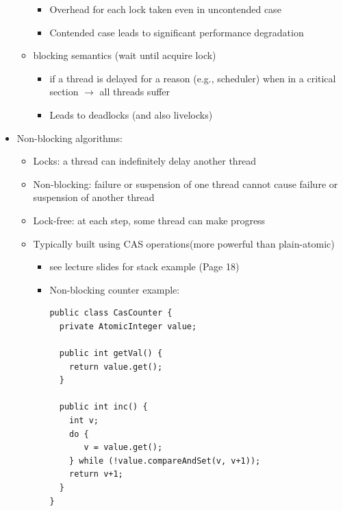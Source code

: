 \documentclass[a4paper]{article}
\begin{document}
\begin{itemize}
\begin{itemize}
\begin{itemize}
\item Overhead for each lock taken even in uncontended case
\item Contended case leads to significant performance degradation
\end{itemize}
\item blocking semantics (wait until acquire lock)
\begin{itemize}
\item  if a thread is delayed for a reason (e.g., scheduler) when in a critical section $\rightarrow$ all threads suffer
\item Leads to deadlocks (and also livelocks)
\end{itemize}
\end{itemize}
\item Non-blocking algorithms: 
\begin{itemize}
\item Locks: a thread can indefinitely delay another thread
\item Non-blocking: failure or suspension of one thread cannot cause failure or suspension of another thread
\item Lock-free: at each step, some thread can make progress 
\item Typically built using CAS operations(more powerful than plain-atomic)
\begin{itemize}
\item see lecture slides for stack example (Page 18)
\item Non-blocking counter example:
\begin{lstlisting}
public class CasCounter {
  private AtomicInteger value;

  public int getVal() {
    return value.get();
  }

  public int inc() {
    int v;
    do {
       v = value.get();
    } while (!value.compareAndSet(v, v+1));
    return v+1;
  }
}
\end{lstlisting}
\end{itemize}
\end{itemize}
\end{itemize}
\end{document}
